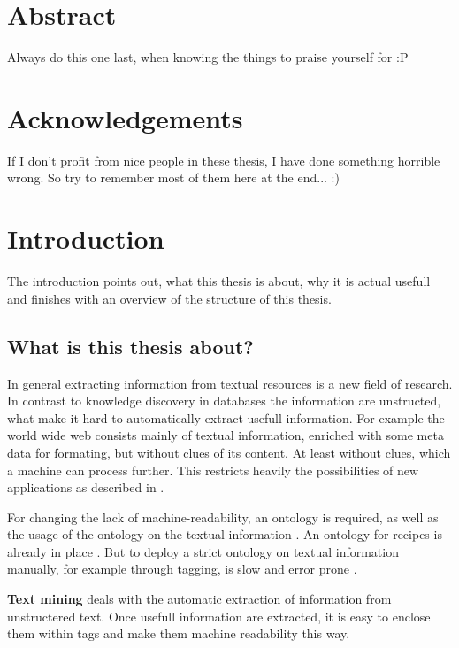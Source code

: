 \documentclass[12pt, twoside]{report}
\begin{document}
\chapter*{Abstract}
Always do this one last, when knowing the things to praise  yourself for :P

\chapter*{Acknowledgements}
If I don't profit from nice people in these thesis, I have done something horrible wrong. So try to remember most of them here at the end... :)

\tableofcontents



\chapter{Introduction}

The introduction points out, what this thesis is about, why it is actual usefull and finishes with an overview of the structure of this thesis.

\section{What is this thesis about?}
In general extracting information from textual resources is a new field of research. In contrast to knowledge discovery in databases the information are unstructed, what make it hard to automatically extract usefull information. For example the world wide web consists mainly of textual information, enriched with some meta data for formating, but without clues of its content. At least without clues, which a machine can process further. This restricts heavily the possibilities of new applications as described in \parencite{semanticWeb}.

For changing the lack of machine-readability, an ontology is required, as well as the usage of the ontology on the textual information \parencite{semanticWeb}. An ontology for recipes is already in place \parencite{schemaRecipe}. But to deploy a strict ontology on textual information manually, for example through tagging, is slow and error prone \parencite{manualTagging}.

\textbf{Text mining} deals with the automatic extraction of information from unstructered text. Once usefull information are extracted, it is easy to enclose them within tags and make them machine readability this way.
\end{document}

